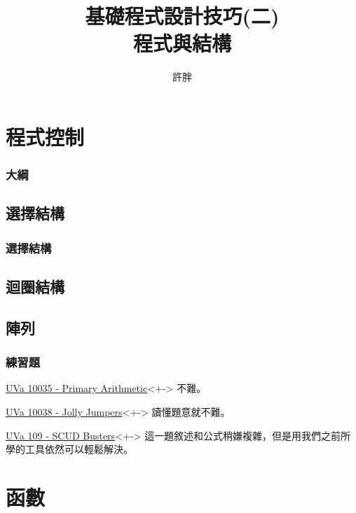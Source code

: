 \documentclass[utf8]{beamer}
\begin{document}
\begin{CJK}{UTF8}{bkai}

\title{基礎程式設計技巧(二)\\程式與結構}
\author{許胖}

\section{程式控制}
\begin{frame}
  \frametitle{大綱}
  \begin{multicols}{2}
    \tableofcontents[currentsection]
  \end{multicols}
\end{frame}

\subsection{選擇結構}

\begin{frame}
  \frametitle{選擇結構}
\end{frame}

\subsection{迴圈結構}
\subsection{陣列}

\begin{frame}
  \frametitle{練習題}
  \begin{exampleblock}{\href{http://unfortunate-dog.github.io/articles/100/p10035/}{UVa 10035 - Primary Arithmetic}}<+->
  \label{uva:10035}
  不難。
  \end{exampleblock}
  \begin{exampleblock}{\href{http://unfortunate-dog.github.io/articles/100/p10038/}{UVa 10038 - Jolly Jumpers}}<+->
  \label{uva:10038}
  讀懂題意就不難。
  \end{exampleblock}
  \begin{exampleblock}{\href{http://unfortunate-dog.github.io/articles/1/p109/}{UVa 109 - SCUD Busters}}<+->
  \label{uva:591}
  這一題敘述和公式稍嫌複雜，但是用我們之前所學的工具依然可以輕鬆解決。
  \end{exampleblock}
\end{frame}

\section{函數}

\end{CJK}
\end{document}
